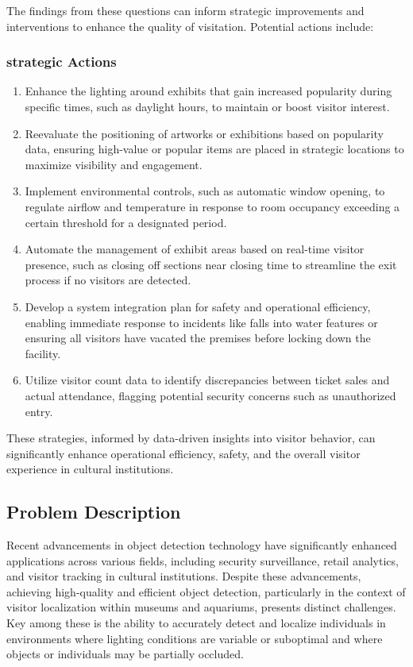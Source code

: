 The findings from these questions can inform strategic improvements and interventions to enhance the quality of visitation. Potential actions include:
\subsubsection*{strategic Actions}
\begin{enumerate}
    \item Enhance the lighting around exhibits that gain increased popularity during specific times, such as daylight hours, to maintain or boost visitor interest.
    \item Reevaluate the positioning of artworks or exhibitions based on popularity data, ensuring high-value or popular items are placed in strategic locations to maximize visibility and engagement.
    \item Implement environmental controls, such as automatic window opening, to regulate airflow and temperature in response to room occupancy exceeding a certain threshold for a designated period.
    \item Automate the management of exhibit areas based on real-time visitor presence, such as closing off sections near closing time to streamline the exit process if no visitors are detected.
    \item Develop a system integration plan for safety and operational efficiency, enabling immediate response to incidents like falls into water features or ensuring all visitors have vacated the premises before locking down the facility.
    \item Utilize visitor count data to identify discrepancies between ticket sales and actual attendance, flagging potential security concerns such as unauthorized entry.
\end{enumerate} 

These strategies, informed by data-driven insights into visitor behavior, can significantly enhance operational efficiency, safety, and the overall visitor experience in cultural institutions.

\subsection{Problem Description}
Recent advancements in object detection technology have significantly enhanced applications across various fields, including security surveillance, retail analytics, and visitor tracking in cultural institutions. Despite these advancements, achieving high-quality and efficient object detection, particularly in the context of visitor localization within museums and aquariums, presents distinct challenges. Key among these is the ability to accurately detect and localize individuals in environments where lighting conditions are variable or suboptimal and where objects or individuals may be partially occluded.

